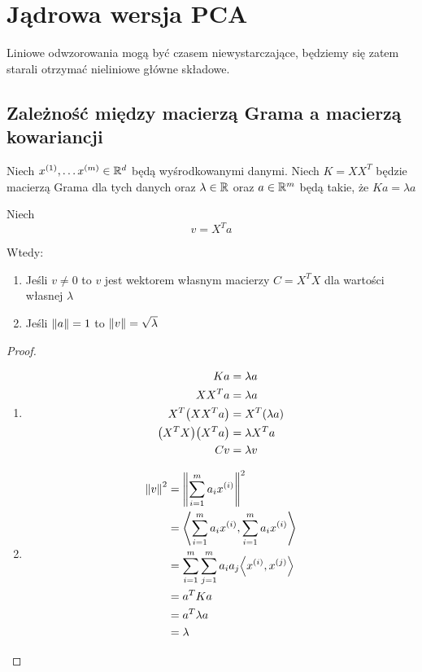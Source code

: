 \section{Jądrowa wersja PCA}

Liniowe odwzorowania mogą być czasem niewystarczające, będziemy się zatem starali otrzymać nieliniowe główne składowe.

\subsection{Zależność między macierzą Grama a macierzą kowariancji}

\begin{lemma}
Niech \( x^{(1)}, \dots x^{(m)} \in \mathbb{R}^d \) będą wyśrodkowanymi danymi.
Niech \( K = XX^T \) będzie macierzą Grama dla tych danych
oraz \( \lambda \in  \mathbb{R} \) oraz \( a \in \mathbb{R}^m \) będą takie, że \( Ka = \lambda a \)

Niech 
\[
    v = X^Ta
\]

Wtedy:
\begin{enumerate}
    \item Jeśli \( v \neq 0 \) to \( v \) jest wektorem własnym macierzy \( C = X^TX \) dla wartości własnej \( \lambda \)
    \item Jeśli \( \left\Vert a \right\Vert = 1 \) to \( \left\Vert v \right\Vert = \sqrt{\lambda} \)
\end{enumerate}
\end{lemma}
\begin{proof} \( \)

\begin{enumerate}
    \item 
        \begin{align*}
            Ka &= \lambda a \\
            XX^Ta &= \lambda a \\
            X^T\pars{XX^Ta} &= X^T \pars{\lambda a} \\
            \pars{X^TX}\pars{X^Ta} &= \lambda X^T a \\
            Cv &= \lambda v
        \end{align*}
        
    \item 
        \begin{align*}
            \norm{v}^2
                &= \norm{\sum_{i=1}^m a_i x^{(i)}}^2 \\
                &= \dotproduct{\sum_{i=1}^m a_i x^{(i)}, \sum_{i=1}^m a_i x^{(i)}} \\
                &= \sum_{i=1}^m \sum_{j=1}^m a_i a_j\dotproduct{x^{(i)}, x^{(j)}} \\
                &= a^TKa \\
                &= a^T\lambda a \\
                &= \lambda
        \end{align*}
    
\end{enumerate}
\end{proof}

